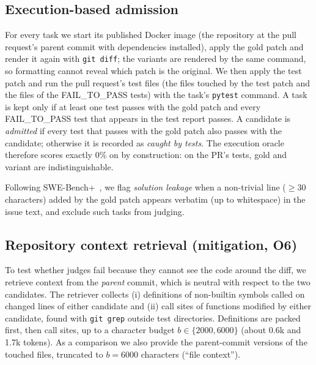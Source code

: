 \subsection{Execution-based admission}
For every task we start its published Docker image (the repository at the
pull request's parent commit with dependencies installed), apply the gold patch
and render it again with \texttt{git diff}; the variants are rendered by the
same command, so formatting cannot reveal which patch is the original.  We then
apply the test patch and run the pull request's test files (the files touched by
the test patch and the files of the FAIL\_TO\_PASS tests) with the task's
\texttt{pytest} command.  A task is kept only if at least one test passes with the
gold patch and every FAIL\_TO\_PASS test that appears in the test report passes.  A candidate is \emph{admitted} if every test that passes
with the gold patch also passes with the candidate; otherwise it is recorded as
\emph{caught by tests}.  The execution oracle therefore scores exactly 0\% on
\RJB{} by construction: on the PR's tests, gold and variant are
indistinguishable.

Following SWE-Bench+~\cite{aleithan2024swebenchplus}, we flag \emph{solution
leakage} when a non-trivial line ($\geq$30 characters) added by the gold patch
appears verbatim (up to whitespace) in the issue text, and exclude such tasks
from judging.

\subsection{Repository context retrieval (mitigation, O6)}
To test whether judges fail because they cannot see the code around the diff,
we retrieve context from the \emph{parent} commit, which is neutral with respect
to the two candidates.  The retriever collects (i) definitions of non-builtin
symbols called on changed lines of either candidate and (ii) call sites of
functions modified by either candidate, found with \texttt{git grep} outside
test directories.  Definitions are packed first, then call sites, up to a
character budget $b\in\{2000, 6000\}$ (about 0.6k and 1.7k tokens).  As a
comparison we also provide the parent-commit versions of the touched files,
truncated to $b=6000$ characters (``file context'').


